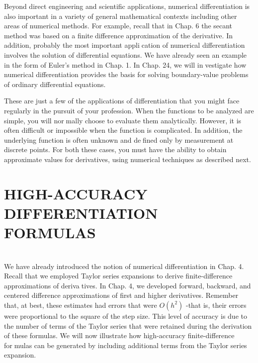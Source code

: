 Beyond direct engineering and scientific applications, numerical differentiation is also
important in a variety of general mathematical contexts including other areas of numerical
methods. For example, recall that in Chap. 6 the secant method was based on a finitedifference approximation of the derivative. In addition, probably the most important application of numerical differentiation involves the solution of differential equations. We have
already seen an example in the form of Euler’s method in Chap. 1. In Chap. 24, we will investigate how numerical differentiation provides the basis for solving boundary-value
problems of ordinary differential equations.

These are just a few of the applications of differentiation that you might face regularly
in the pursuit of your profession. When the functions to be analyzed are simple, you will normally choose to evaluate them analytically. However, it is often difficult or impossible when
the function is complicated. In addition, the underlying function is often unknown and defined only by measurement at discrete points. For both these cases, you must have the ability
to obtain approximate values for derivatives, using numerical techniques as described next.

\vspace{0,6in}
\chapter{HIGH-ACCURACY DIFFERENTIATION FORMULAS}
\vspace{0,1in}
\hline\\
\vspace{0,1in}
We have already introduced the notion of numerical differentiation in Chap. 4. Recall that
we employed Taylor series expansions to derive finite-difference approximations of derivatives. In Chap. 4, we developed forward, backward, and centered difference approximations
of first and higher derivatives. Remember that, at best, these estimates had errors that were $O(h^{2})$ -that is, their errors were proportional to the square of the step size. This level of
accuracy is due to the number of terms of the Taylor series that were retained during the derivation of these formulas. We will now illustrate how high-accuracy finite-difference formulas can be generated by including additional terms from the Taylor series expansion.

